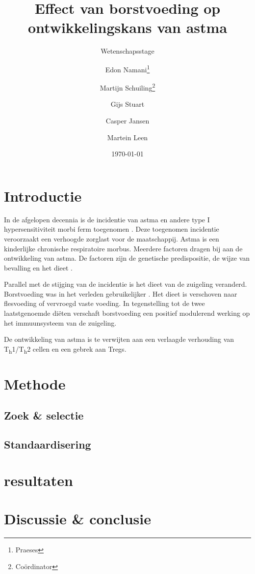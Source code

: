 \documentclass[abstract=true]{scrartcl}
\title{Effect van borstvoeding op ontwikkelingskans van astma}
\subtitle{Wetenschapsstage}
\author{Edon Namani\thanks{Praeses} \and Martijn Schuiling\thanks{Co\"ordinator} \and Gijs Stuart \and Casper Jansen \and Martein Leen}
\date{\today}
\begin{document}
\maketitle
    \begin{abstract}

    \end{abstract}

\section{Introductie}
In de afgelopen decennia is de incidentie van astma en andere type I hypersensitiviteit morbi ferm toegenomen \cite{Platts_Mills_2015}. Deze toegenomen incidentie veroorzaakt een verhoogde zorglast voor de maatschappij. Astma is een kinderlijke chronische respiratoire morbus. Meerdere factoren dragen bij aan de ontwikkeling van astma. De factoren zijn de genetische predispositie, de wijze van bevalling en het dieet \cite{abbas2017cellular,Houghteling_2015}.

Parallel met de stijging van de incidentie is het dieet van de zuigeling veranderd. Borstvoeding was in het verleden gebruikelijker \cite{world1981contemporary,Victora_2016,Rollins_2016}. Het dieet is verschoven naar flesvoeding of vervroegd vaste voeding. In tegenstelling tot de twee laatstgenoemde diëten verschaft borstvoeding een positief modulerend werking op het immuunsysteem van de zuigeling.

De ontwikkeling van astma is te verwijten aan een verlaagde verhouding van T\textsubscript{h}1/T\textsubscript{h}2 cellen en een gebrek aan Tregs.



\section{Methode}
    \subsection{Zoek \& selectie}

    \subsection{Standaardisering}

\section{resultaten}

\section{Discussie \& conclusie}

\printbibliography 
\end{document}
